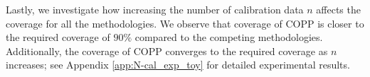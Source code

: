 
Lastly, we investigate how increasing the number of calibration data $n$ affects the coverage for all the methodologies. We observe that coverage of COPP is closer to the required coverage of $90\%$ compared to the competing methodologies. Additionally, the coverage of COPP converges to the required coverage as $n$ increases; see Appendix \ref{app:N-cal_exp_toy} for detailed experimental results.


